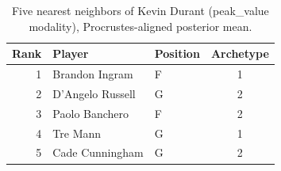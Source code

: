 \begin{table}[htbp]
  \centering\small
  \begin{tabular}{rllc}
    \toprule
    Rank & Player & Position & Archetype \\
    \midrule
    1 & Brandon Ingram & F & 1 \\
    2 & D'Angelo Russell & G & 2 \\
    3 & Paolo Banchero & F & 2 \\
    4 & Tre Mann & G & 1 \\
    5 & Cade Cunningham & G & 2 \\
    \bottomrule
  \end{tabular}
  \caption{Five nearest neighbors of Kevin Durant (peak_value modality), Procrustes-aligned posterior mean.}
  \label{tab:Kevin_Durant_neighbors_peak_value}
\end{table}

